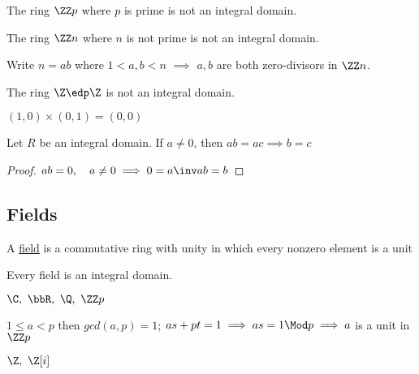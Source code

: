 \begin{example}
  The ring \(\ZZ p\) where \(p\) is prime is not an integral domain.
\end{example}

\begin{nonexample}
  The ring \(\ZZ n\) where \(n\) is not prime is not an integral domain.
  \begin{note}
    Write \(n=ab\) where \(1<a,b<n\) \(\implies\) \(a,b\) are both zero-divisors in \(\ZZ n\).
  \end{note}
\end{nonexample}

\begin{nonexample}
  The ring \(\Z \edp \Z\) is not an integral domain.
  \begin{note}
    \((1,0)\times(0,1) = (0,0)\)
  \end{note}
\end{nonexample}

\begin{theorem}[Cancellation]
  Let \(R\) be an integral domain. If \(a\neq 0\), then \(ab=ac\implies b=c\)
\end{theorem}

\begin{proof}
  \(ab = 0,\quad a\neq 0 \implies 0=a\inv ab = b\)
\end{proof}

\subsection{Fields}
\begin{definition}[Field]
  A \uline{field} is a commutative ring with unity in which every nonzero element is a unit
\end{definition}

\begin{fact}
  Every field is an integral domain.
\end{fact}

\begin{examples}
  \(\C,\ \bbR,\ \Q,\ \ZZ p\)
  \begin{note}[\(\ZZ p\)]
    \(1\leq a < p\) then \(gcd(a,p) = 1\); \(as+pt=1 \implies as = 1 \Mod p \implies a\) is a unit in \(\ZZ p\)
  \end{note}
\end{examples}

\begin{nonexamples}
  \(\Z,\ \Z[i]\)
\end{nonexamples}

